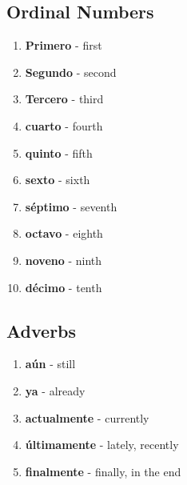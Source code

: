 \documentclass[12pt]{article}
\begin{document}
        \subsection{Ordinal Numbers}
            \begin{enumerate}
                \item \textbf{Primero} - first
                \item \textbf{Segundo} - second
                \item \textbf{Tercero} - third
                \item \textbf{cuarto} - fourth
                \item \textbf{quinto} - fifth
                \item \textbf{sexto} - sixth
                \item \textbf{séptimo} - seventh
                \item \textbf{octavo} - eighth
                \item \textbf{noveno} - ninth
                \item \textbf{décimo} - tenth
            \end{enumerate}
        \subsection{Adverbs}
            \begin{enumerate}
                \item \textbf{aún} - still
                \item \textbf{ya} - already
                \item \textbf{actualmente} - currently
                \item \textbf{últimamente} - lately, recently
                \item \textbf{finalmente} - finally, in the end
            \end{enumerate}
\end{document}
